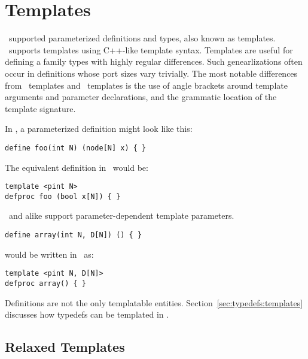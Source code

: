 
\section{Templates}
\label{sec:templates}

\CAST\ supported parameterized definitions and types, also known as templates.
\hac\ supports templates using C++-like template syntax.  
Templates are useful for defining a family types with 
highly regular differences.  
Such genearlizations often occur in definitions whose 
port sizes vary trivially.  
The most notable differences from \CAST\ templates and \hac\ templates
is the use of angle brackets around template arguments 
and parameter declarations, and the grammatic location of the 
template signature.  

In \CAST, a parameterized definition might look like this:

\begin{verbatim}
define foo(int N) (node[N] x) { }
\end{verbatim}

The equivalent definition in \hac\ would be:

\begin{verbatim}
template <pint N>
defproc foo (bool x[N]) { }
\end{verbatim}

\CAST\ and \hac alike support parameter-dependent template parameters.

\begin{verbatim}
define array(int N, D[N]) () { }
\end{verbatim}

\noindent
would be written in \hac\ as:

\begin{verbatim}
template <pint N, D[N]>
defproc array() { }
\end{verbatim}

Definitions are not the only templatable entities.  
Section~\ref{sec:typedefs:templates} discusses how typedefs 
can be templated in \hac.  

\subsection{Relaxed Templates}
\label{sec:templates:relaxed}

